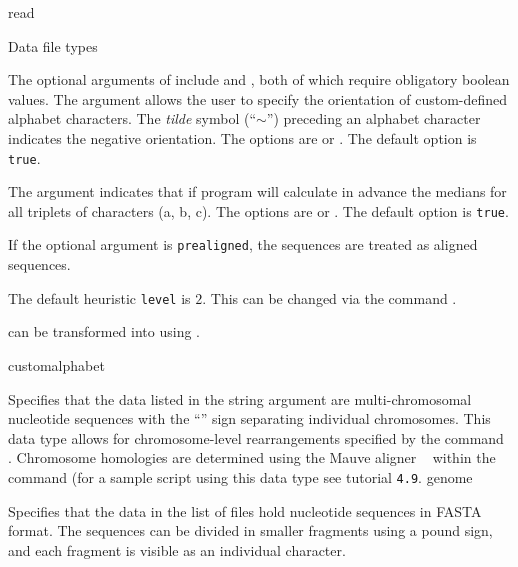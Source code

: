 \begin{command}{read}{}
\begin{arguments}
\begin{argumentgroup}{Data file types}
{	The optional arguments of  include 
	and , both of which require obligatory boolean values. The argument
	 allows the user to specify the orientation of custom-defined alphabet
	characters. The \emph{tilde} symbol (``$\sim$'') preceding an alphabet character indicates
	the negative orientation. The options are 
	or . The default option is \texttt{true}.
	
	The argument  indicates that if program will calculate in advance
	the medians for all triplets of characters (a, b, c). The options are  or
	. The default option is \texttt{true}.
	
	If the optional argument \poylident is \texttt{prealigned}, the sequences are
	treated as aligned sequences.
	
	The default heuristic \texttt{level} is $2$.  This can be changed via the command .
	
	can be transformed into  using .}
	 {customalphabet}
        
            {Specifies that the data listed in the string argument are
            multi-chromosomal nucleotide sequences with the ``\atsymbol'' sign 
            separating individual chromosomes. This data type
            allows for chromosome-level rearrangements specified by
           the command . Chromosome
            homologies are determined using the Mauve aligner ~\cite{darlingetal2004} within 	 	
            the command 
            (for a sample script using this data type see tutorial \texttt{4.9}.} 
            {genome}
            
            {Specifies that the data in the list of files hold nucleotide
            sequences in FASTA format. The sequences can be divided in smaller
            fragments using a pound sign, and each fragment is visible as an
            individual character.} 
            {}


\end{argumentgroup}
\end{arguments}
\end{command}
